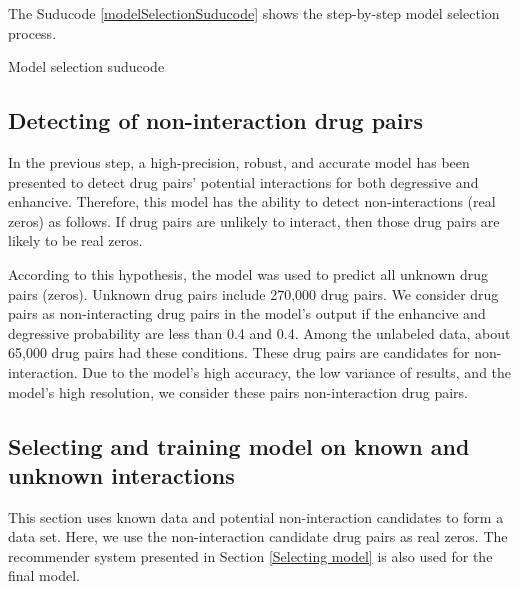\documentclass{bmcart}
\begin{document}
The Suducode \ref{modelSelectionSuducode} shows the step-by-step model selection process.

\renewcommand{\algorithmicrequire}{\textbf{Input:}}
\renewcommand{\algorithmicensure}{\textbf{Output:}}
\begin{algorithm}[!h]
\caption{Model selection suducode}
\label{modelSelectionSuducode}
\end{algorithm}


\subsection*{Detecting of non-interaction drug pairs}
In the previous step, a high-precision, robust, and accurate model has been presented to detect drug pairs' potential interactions for both degressive and enhancive. Therefore, this model has the ability to detect non-interactions (real zeros) as follows. If drug pairs are unlikely to interact, then those drug pairs are likely to be real zeros.

According to this hypothesis, the model was used to predict all unknown drug pairs (zeros). Unknown drug pairs include 270,000 drug pairs. We consider drug pairs as non-interacting drug pairs in the model's output if the enhancive and degressive probability are less than 0.4 and 0.4. Among the unlabeled data, about 65,000 drug pairs had these conditions. These drug pairs are candidates for non-interaction. Due to the model's high accuracy, the low variance of results, and the model's high resolution, we consider these pairs non-interaction drug pairs.

\subsection*{Selecting and training model on known and unknown interactions}
This section uses known data and potential non-interaction candidates to form a data set. Here, we use the non-interaction candidate drug pairs as real zeros. The recommender system presented in Section \ref{Selecting model} is also used for the final model.
\end{document}
